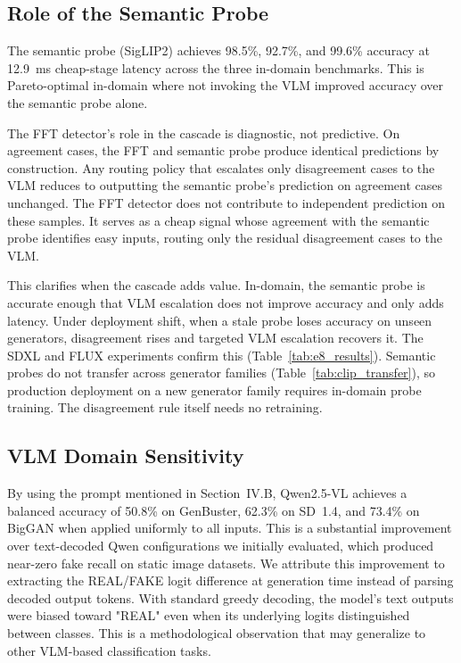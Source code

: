 \documentclass{ieeeaccess}
\begin{document}
\subsection{Role of the Semantic Probe}

The semantic probe (SigLIP2) achieves 98.5\%, 92.7\%, and 99.6\% accuracy at
12.9~ms cheap-stage latency across the three in-domain benchmarks. This is
Pareto-optimal in-domain where not invoking the VLM improved accuracy over the
semantic probe alone.

The FFT detector's role in the cascade is diagnostic, not predictive. On agreement
cases, the FFT and semantic probe produce identical predictions by construction. Any
routing policy that escalates only disagreement cases to the VLM reduces to outputting
the semantic probe's prediction on agreement cases unchanged. The FFT detector
 does not contribute to independent prediction on these samples. It serves as a cheap signal
whose agreement with the semantic probe identifies easy inputs, routing only the
residual disagreement cases to the VLM.

This clarifies when the cascade adds value. In-domain, the semantic probe is accurate
enough that VLM escalation does not improve accuracy and only adds latency. Under
deployment shift, when a stale probe loses accuracy on unseen generators, disagreement
rises and targeted VLM escalation recovers it. The SDXL and FLUX experiments confirm
this (Table~\ref{tab:e8_results}). Semantic probes do not transfer across generator
families (Table~\ref{tab:clip_transfer}), so production deployment on a new generator
family requires in-domain probe training. The disagreement rule itself needs no
retraining.

\subsection{VLM Domain Sensitivity}

By using the prompt mentioned in Section~IV.B, Qwen2.5-VL achieves a balanced accuracy of 50.8\% on GenBuster, 62.3\% on SD~1.4, and 73.4\% on BigGAN when applied uniformly to all inputs. This is a substantial improvement over text-decoded Qwen configurations we initially evaluated, which produced near-zero fake recall on static image datasets. We attribute this improvement to extracting the REAL/FAKE logit difference at generation time instead of parsing decoded output tokens. With standard greedy decoding, the model's text outputs were biased toward "REAL" even when its underlying logits distinguished between classes. This is a methodological observation that may generalize to other VLM-based classification tasks.
\end{document}
